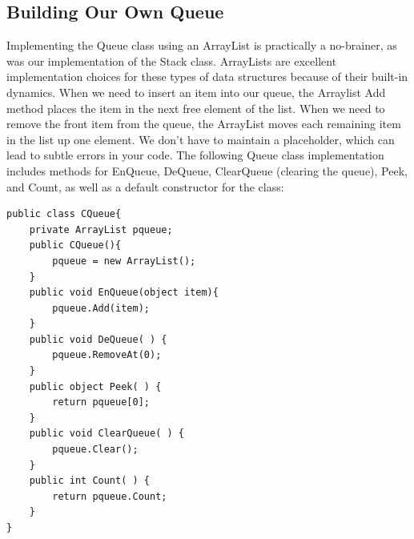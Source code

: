 \documentclass[12pt,a4paper,final,twoside,titlepage]{book}
\begin{document}
\subsection{Building Our Own Queue}
Implementing the Queue class using an ArrayList is practically a no-brainer, as was our implementation of the Stack class. ArrayLists are excellent implementation choices for these types of data structures because of their built-in dynamics. When we need to insert an item into our queue, the Arraylist Add method places the item in the next free element of the list. When we need to remove the front item from the queue, the ArrayList moves each remaining item in the list up one element. We don’t have to maintain a placeholder, which can lead to subtle errors in your code.
The following Queue class implementation includes methods for EnQueue, DeQueue, ClearQueue (clearing the queue), Peek, and Count, as well as a default constructor for the class:
\begin{lstlisting}
public class CQueue{
	private ArrayList pqueue; 
	public CQueue(){
		pqueue = new ArrayList();
	}
	public void EnQueue(object item){
		pqueue.Add(item);
	}
	public void DeQueue( ) {
		pqueue.RemoveAt(0);
	}
	public object Peek( ) {
		return pqueue[0];
	}
	public void ClearQueue( ) {
		pqueue.Clear();
	}
	public int Count( ) {
		return pqueue.Count;
	}
}
\end{lstlisting}
\end{document}
